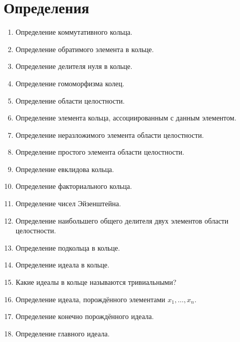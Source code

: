 \section{Определения}

\begin{enumerate}

\item Определение коммутативного кольца.

\item Определение обратимого элемента в кольце.

\item Определение делителя нуля в кольце.

\item Определение гомоморфизма колец.

\item Определение области целостности.

\item Определение элемента кольца, ассоциированным с данным элементом.

\item Определение неразложимого элемента области целостности.

\item Определение простого элемента области целостности.

\item Определение евклидова кольца.

\item Определение факториального кольца.

\item Определение чисел Эйзенштейна.

\item Определение наибольшего общего делителя двух элементов области целостности.

\item Определение подкольца в кольце.

\item Определение идеала в кольце.

\item Какие идеалы в кольце называются тривиальными?

\item Определение идеала, порождённого элементами $x_1, \ldots, x_n$.

\item Определение конечно порождённого идеала.

\item Определение главного идеала.


\end{enumerate}
